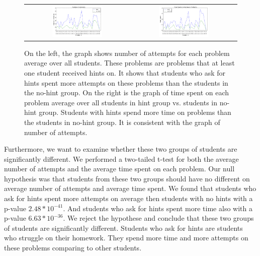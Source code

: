 \documentclass{llncs}
\begin{document}
\begin{figure}[ht]
\centering
   \begin{tabular}{c c}
		\includegraphics[width=0.5\textwidth]{image/tries_analysis.png} &
		\includegraphics[width=0.5\textwidth]{image/times_analysis.png}
	\end{tabular}
    \caption{On the left, the graph shows number of attempts for each problem average over all students. These problems are problems that at least one student received hints on. It shows that students who ask for hints spent more attempts on these problems than the students in the no-hint group. On the right is the graph of time spent on each problem average over all students in hint group vs. students in no-hint group. Students with hints spend more time on problems than the students in no-hint group. It is consistent with the graph of number of attempts.}
    \label{fig:tries_times_analysis}
\end{figure}

Furthermore, we want to examine whether these two groups of students are significantly different. We performed a two-tailed t-test for both the average number of attempts and the average time spent on each problem. Our null hypothesis was that students from these two groups should have no different on average number of attempts and average time spent. We found that students who ask for hints spent more attempts on average then students with no hints with a p-value $2.48*10^{-41}$. And students who ask for hints spent more time also with a p-value $6.63*10^{-36}$. We reject the hypothese and conclude that these two groups of students are significantly different. Students who ask for hints are students who struggle on their homework. They spend more time and more attempts on these problems comparing to other students.
\end{document}
